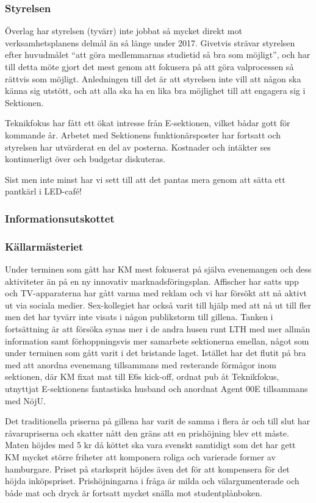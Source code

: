 \documentclass[../_main/handlingar.tex]{subfiles}
\begin{document}

\subsubsection*{Styrelsen}
Överlag har styrelsen (tyvärr) inte jobbat så mycket direkt mot verksamhetsplanens delmål än så länge under 2017. Givetvis strävar styrelsen efter huvudmålet ``att göra medlemmarnas studietid så bra som möjligt'', och har till detta möte gjort det mest genom att fokusera på att göra valprocessen så rättvis som möjligt. Anledningen till det är att styrelsen inte vill att någon ska känna sig utstött, och att alla ska ha en lika bra möjlighet till att engagera sig i Sektionen.

Teknikfokus har fått ett ökat intresse från E-sektionen, vilket bådar gott för kommande år. Arbetet med Sektionens funktionärsposter har fortsatt och styrelsen har utvärderat en del av posterna. Kostnader och intäkter ses kontinuerligt över och budgetar diskuteras.

Sist men inte minst har vi sett till att det pantas mera genom att sätta ett pantkärl i LED-café!

\subsubsection*{Informationsutskottet}

\subsubsection*{Källarmästeriet}
Under terminen som gått har KM mest fokuserat på själva evenemangen och dess aktiviteter än på en ny innovativ marknadsföringsplan. Affischer har satts upp och TV-apparaterna har gått varma med reklam och vi har försökt att nå aktivt ut via sociala medier. Sex-kollegiet har också varit till hjälp med att nå ut till fler men det har tyvärr inte visats i någon publikstorm till gillena. Tanken i fortsättning är att försöka synas mer i de andra husen runt LTH med mer allmän information samt förhoppningsvis mer samarbete sektionerna emellan, något som under terminen som gått varit i det bristande laget. Istället har det flutit på bra med att anordna evenemang tillsammans med resterande förmågor inom sektionen, där KM fixat mat till E6s kick-off, ordnat pub åt Teknikfokus, utnyttjat E-sektionens fantastiska husband och anordnat Agent 00E tillsammans med NöjU.

Det traditionella priserna på gillena har varit de samma i flera år och till slut har råvarupriserna och skatter nått den gräns att en prishöjning blev ett måste. Maten höjdes med 5 kr då köttet ska vara svenskt samtidigt som det har gett KM mycket större friheter att komponera roliga och varierade former av hamburgare. Priset på starksprit höjdes även det för att kompensera för det höjda inköpspriset. Prishöjningarna i fråga är milda och välargumenterade och både mat och dryck är fortsatt mycket snälla mot studentplånboken.
\end{document}
